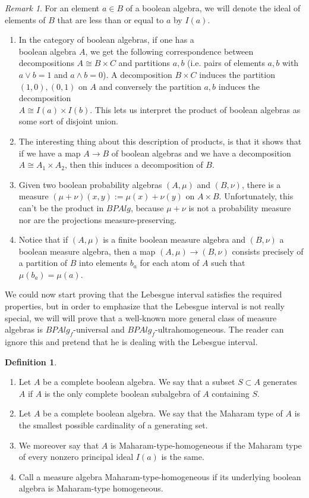 \documentclass[a4paper]{amsproc}
\theoremstyle{plain}
\theoremstyle{definition}
\newtheorem{definition}[theorem]{Definition}
\theoremstyle{remark}
\newtheorem{remark}[theorem]{Remark}
\numberwithin{equation}{section}
\begin{document}
\begin{remark}\label{partitions}
For an element $a \in B$ of a boolean algebra, we will denote the ideal of elements of $B$ that are less than or equal to $a$ by $I(a)$.
\begin{enumerate}
\item In the category of boolean algebras, if one has a \\ boolean algebra $A$, we get the following correspondence between decompositions $A \cong B \times C$ and partitions $a,b$ (i.e. pairs of elements $a,b$ with $a \vee b = 1$ and $a \wedge b = 0$). A decomposition $B \times C$ induces the partition $(1,0), (0,1)$ on $A$ and conversely the partition $a,b$ induces the decomposition \\ $A \cong I(a) \times I(b)$. This lets us interpret the product of boolean algebras as some sort of disjoint union.
\item The interesting thing about this description of products, is that it shows that if we have a map $A \to B$ of boolean algebras and we have a decomposition $A \cong A_1 \times A_2$, then this induces a decomposition of $B$.
\item Given two boolean probability algebras $(A, \mu)$ and $(B, \nu)$, there is a measure $(\mu + \nu)(x,y) := \mu(x) + \nu(y)$ on $A \times B$. Unfortunately, this can't be the product in $BPAlg$, because $\mu + \nu$ is not a probability measure nor are the projections measure-preserving.
\item Notice that if $(A,\mu)$ is a finite boolean measure algebra and $(B,\nu)$ a boolean measure algebra, then a map $(A,\mu) \to (B,\nu)$ consists precisely of a partition of $B$ into elements $b_a$ for each atom of $A$ such that $\mu(b_a) = \mu(a)$.
\end{enumerate}
\end{remark}

We could now start proving that the Lebesgue interval satisfies the required properties, but in order to emphasize that the Lebesgue interval is not really special, we will will prove that a well-known more general class of measure algebras is $BPAlg_f$-universal and $BPAlg_f$-ultrahomogeneous. The reader can ignore this and pretend that he is dealing with the Lebesgue interval.

\begin{definition} \label{maharam_type_homogeneous}
\begin{enumerate}
\item Let $A$ be a complete boolean algebra. We say that a subset $S \subset A$ generates $A$ if $A$ is the only complete boolean subalgebra of $A$ containing $S$.
\item Let $A$ be a complete boolean algebra. We say that the Maharam type of $A$ is the smallest possible cardinality of a generating set.
\item We moreover say that $A$ is Maharam-type-homogeneous if the Maharam type of every nonzero principal ideal $I(a)$ is the same.
\item Call a measure algebra Maharam-type-homogeneous if its underlying boolean algebra is Maharam-type homogeneous.
\end{enumerate}
\end{definition}
\end{document}
